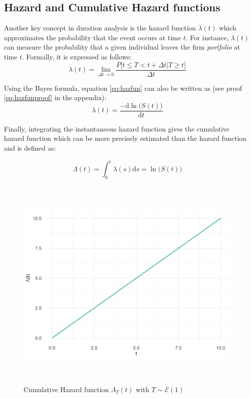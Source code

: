 \documentclass[
]{book}
\begin{document}
\hypertarget{hazard-and-cumulative-hazard-functions}{%
\subsection{Hazard and Cumulative Hazard functions}\label{hazard-and-cumulative-hazard-functions}}

Another key concept in duration analysis is the hazard function \(\lambda(t)\) which approximates the probability that the event occurs at time \(t\). For instance, \(\lambda(t)\) can measure the probability that a given individual leaves the firm \emph{portfolio} at time \(t\). Formally, it is expressed as follows:
\begin{equation}
  \lambda(t) = \lim_{\Delta t \to 0} \frac{P\big[t \leq T < t + \Delta t | T \geq t \big]}{\Delta t}
  \label{eq:hazfun}
\end{equation}

Using the Bayes formula, equation \eqref{eq:hazfun} can also be written as (see proof \eqref{eq:hazfunproof} in the appendix):
\begin{equation}
  \lambda(t) = \frac{-\text{d} \ln \big(S(t)\big)}{\text{d} t}
  \label{eq:hazfunbis}
\end{equation}

Finally, integrating the instantaneous hazard function gives the cumulative hazard function which can be more precisely estimated than the hazard function \citep{CAMERON_TRIVEDI} and is defined as:

\begin{equation}
  \Lambda (t) = \int_{0}^{t} \lambda(s) \text{d}s = \ln \big(S(t)\big)
  \label{eq:cumhazfun}
\end{equation}

\begin{figure}

{\centering \includegraphics[width=400pt,height=300pt]{./imgs/cum_haz_plot} 

}

\caption{Cumulative Hazard function $\Lambda_T(t)$ with $T \sim \mathcal{E} (1)$}\label{fig:cumhazplot}
\end{figure}
\end{document}
